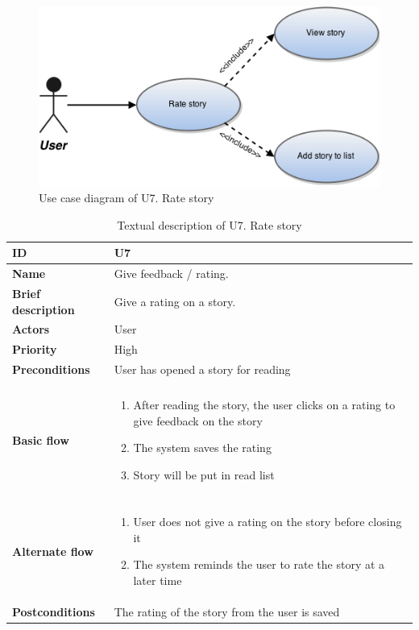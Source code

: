 \begin{figure}[htp]
	\includegraphics[width=\textwidth]{fig/U7}
	\centering
	\caption{Use case diagram of U7. Rate story}
	\label{Fig:U7}
\end{figure}

\begin{table}[htp]
	\centering
	\caption{Textual description of U7. Rate story}
	\begin{tabular}[b]{|l | l|}\hline
		\textbf{ID} 				& U7									\\\hline
		\textbf{Name} 				& Give feedback / rating.				\\\hline
		\textbf{Brief description}	& Give a rating on a story. 			\\\hline
		\textbf{Actors} 			& User									\\\hline
		\textbf{Priority}			& High									\\\hline
		\textbf{Preconditions}		& User has opened a story for reading	\\\hline&\\[-2ex]
		\textbf{Basic flow}			& \begin{minipage}{5in}
			\begin{enumerate}[noitemsep]
				\item After reading the story,  the user clicks on a rating to give feedback on the story
				\item The system saves the rating
				\item Story will be put in read list
			\end{enumerate}						
		\end{minipage}						\\\hline&\\[-2ex]
		\textbf{Alternate flow}		& \begin{minipage}{5in}
			\begin{enumerate}[noitemsep]
				\item User does not give a rating on the story before closing it
				\item The system reminds the user to rate the story at a later time
			\end{enumerate}
		\end{minipage}							\\\hline
		\textbf{Postconditions}		& The rating of the story from the user is saved\\\hline
	\end{tabular}
	\label{Tab:U7}
\end{table}

